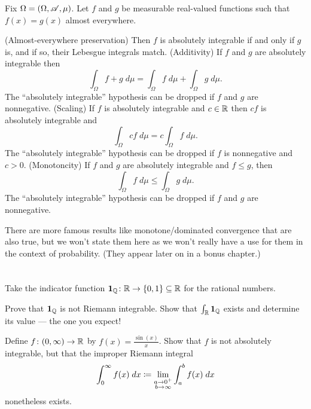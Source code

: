 Fix $\Omega = (\Omega, \mathscr A, \mu)$.
Let $f$ and $g$ be measurable real-valued functions
such that $f(x) = g(x)$ almost everywhere.
\begin{itemize}
	\ii (Almost-everywhere preservation)
	Then $f$ is absolutely integrable if and only if $g$ is,
	and if so, their Lebesgue integrals match.
	\ii (Additivity)
	If $f$ and $g$ are absolutely integrable then
	\[ \int_\Omega f+g \; d\mu
		= \int_\Omega f \; d\mu
		+ \int_\Omega g \; d\mu. \]
	The ``absolutely integrable'' hypothesis can be dropped
	if $f$ and $g$ are nonnegative.
	\ii (Scaling) If $f$ is absolutely integrable and $c \in \mathbb R$
	then $cf$ is absolutely integrable and
	\[ \int_\Omega cf \; d\mu = c \int_\Omega f \; d\mu. \]
	The ``absolutely integrable'' hypothesis can be dropped
	if $f$ is nonnegative and $c > 0$.
	\ii (Monotoncity)
	If $f$ and $g$ are absolutely integrable and $f \le g$, then
	\[ \int_\Omega f \; d\mu \le \int_\Omega g \; d\mu. \]
	The ``absolutely integrable'' hypothesis can be dropped
	if $f$ and $g$ are nonnegative.
\end{itemize}
There are more famous results like monotone/dominated convergence
that are also true, but we won't state them here
as we won't really have a use for them in the context of probability.
(They appear later on in a bonus chapter.)

\section{\problemhead}

\begin{dproblem}
	Take the indicator function
	$\mathbf 1_{\mathbb Q} \colon \mathbb R \to \{0,1\} \subseteq \mathbb R$
	for the rational numbers.
	\begin{enumerate}[(a)]
		\ii Prove that $\mathbf{1}_\mathbb Q$ is not Riemann integrable.
		\ii Show that $\int_\mathbb R \mathbf{1}_\mathbb Q$ exists
		and determine its value --- the one you expect!
	\end{enumerate}
\end{dproblem}

\begin{dproblem}
	\label{prob:sin_improper}
	Define $f \colon (0,\infty) \to \mathbb R$ by $f(x) = \frac{\sin(x)}{x}$.
	Show that $f$ is not absolutely integrable,
	but that the improper Riemann integral
	\[ \int_0^\infty f(x) \; dx \coloneqq
		\lim_{\substack{a \to 0^+ \\ b \to \infty}}
		\int_a^b f(x) \; dx \]
	nonetheless exists.
\end{dproblem}
